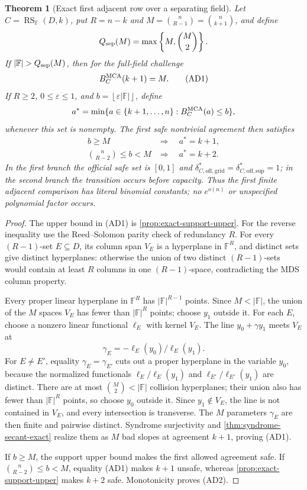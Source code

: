 \documentclass[11pt,a4paper]{amsart}
\numberwithin{equation}{section}
\newtheorem{theorem}{Theorem}[section]
\theoremstyle{remark}
\DeclareMathOperator{\RS}{RS}
\newcommand{\F}{\mathbb F}
\newcommand{\eps}{\varepsilon}
\newcommand{\abs}[1]{\lvert #1\rvert}
\newcommand{\floor}[1]{\left\lfloor #1\right\rfloor}
\begin{document}
\begin{theorem}[Exact first adjacent row over a separating field]
\label{thm:exact-first-adjacent-row}
Let \(C=\RS_\F(D,k)\), put \(R=n-k\) and
\(M=\binom n{R-1}=\binom n{k+1}\), and define
\[
                    Q_{\rm sep}(M)=\max\left\{M,\binom M2\right\}.
\]
If \(\abs\F>Q_{\rm sep}(M)\), then for the full-field challenge
\[
                         B_C^{\rm MCA}(k+1)=M.      \tag{AD1}
\]
If \(R\ge2\), \(0\le\eps\le1\), and
\(b=\floor{\eps\abs\F}\), define
\[
 a^*=\min\{a\in\{k+1,\ldots,n\}:B_C^{\rm MCA}(a)\le b\},
\]
whenever this set is nonempty.  The first safe nontrivial agreement then
satisfies
\[
 \begin{array}{ll}
 b\ge M &\Longrightarrow\quad a^*=k+1,\\[2mm]
 \displaystyle\binom n{R-2}\le b<M
   &\Longrightarrow\quad a^*=k+2.
\end{array}                                       \tag{AD2}
\]
In the first branch the official safe set is \([0,1]\) and
\(\delta_{C,\mathrm{off,grid}}^*
=\delta_{C,\mathrm{off,sup}}^*=1\); in the second branch the transition
occurs before capacity.
Thus the first finite adjacent comparison has literal binomial constants;
no \(e^{o(n)}\) or unspecified polynomial factor occurs.
\end{theorem}

\begin{proof}
The upper bound in \textup{(AD1)} is
\cref{prop:exact-support-upper}.  For the reverse inequality use the
Reed--Solomon parity check of redundancy \(R\).  For every
\((R-1)\)-set \(E\subseteq D\), its column span \(V_E\) is a hyperplane
in \(\F^R\), and distinct sets give distinct hyperplanes: otherwise the
union of two distinct \((R-1)\)-sets would contain at least \(R\) columns
in one \((R-1)\)-space, contradicting the MDS column property.

Every proper linear hyperplane in \(\F^R\) has
\(\abs{\F}^{R-1}\) points.  Since \(M<\abs\F\), the union of the \(M\)
spaces \(V_E\) has fewer than \(\abs{\F}^{R}\) points; choose \(y_1\)
outside it.  For each \(E\),
choose a nonzero linear functional \(\ell_E\) with kernel \(V_E\).
The line \(y_0+\gamma y_1\) meets \(V_E\) at
\[
                 \gamma_E=-\ell_E(y_0)/\ell_E(y_1).
\]
For \(E\ne E'\), equality \(\gamma_E=\gamma_{E'}\) cuts out a proper
hyperplane in the variable \(y_0\), because the normalized functionals
\(\ell_E/\ell_E(y_1)\) and
\(\ell_{E'}/\ell_{E'}(y_1)\) are distinct.  There are at most
\(\binom M2<\abs\F\) collision hyperplanes; their union also has fewer
than \(\abs{\F}^{R}\) points, so choose \(y_0\) outside it.  Since
\(y_1\notin V_E\), the line is not contained in \(V_E\), and every
intersection is transverse.  The \(M\) parameters \(\gamma_E\) are then
finite and pairwise distinct.  Syndrome surjectivity and
\cref{thm:syndrome-secant-exact} realize them as \(M\) bad slopes at
agreement \(k+1\), proving \textup{(AD1)}.

If \(b\ge M\), the support upper bound makes the first allowed agreement
safe.  If \(\binom n{R-2}\le b<M\), equality \textup{(AD1)} makes
\(k+1\) unsafe, whereas
\cref{prop:exact-support-upper} makes \(k+2\) safe.  Monotonicity proves
\textup{(AD2)}.
\end{proof}
\end{document}
